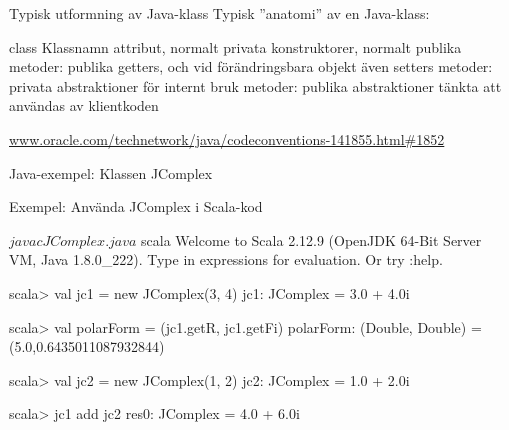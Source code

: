 
\begin{Slide}{Typisk utformning av Java-klass}
Typisk ''anatomi'' av en Java-klass:
\begin{Code}[language=Java]
class Klassnamn {
    attribut, normalt privata
    konstruktorer, normalt publika
    metoder: publika getters, och vid förändringsbara objekt även setters
    metoder: privata abstraktioner för internt bruk
    metoder: publika abstraktioner tänkta att användas av klientkoden
}
\end{Code}
\href{http://www.oracle.com/technetwork/java/codeconventions-141855.html#1852}{www.oracle.com/technetwork/java/codeconventions-141855.html\#1852}
\end{Slide}




\begin{Slide}{Java-exempel: Klassen JComplex}\SlideFontTiny\SlideOnly{\vspace{-1em}}
\end{Slide}




\begin{Slide}{Exempel: Använda JComplex i Scala-kod}
\begin{REPL}
$ javac JComplex.java
$ scala
Welcome to Scala 2.12.9 (OpenJDK 64-Bit Server VM, Java 1.8.0_222).
Type in expressions for evaluation. Or try :help.

scala> val jc1 = new JComplex(3, 4)
jc1: JComplex = 3.0 + 4.0i

scala> val polarForm = (jc1.getR, jc1.getFi)
polarForm: (Double, Double) = (5.0,0.6435011087932844)

scala> val jc2 = new JComplex(1, 2)
jc2: JComplex = 1.0 + 2.0i

scala> jc1 add jc2
res0: JComplex = 4.0 + 6.0i
\end{REPL}
\end{Slide}





